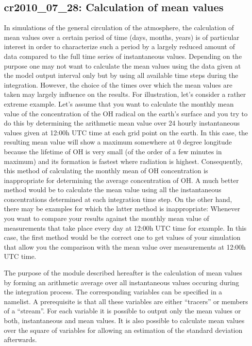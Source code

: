\begin{appendix}
\clearpage\newpage
\section{cr2010\_07\_28: Calculation of mean values}\label{cr20100728}

In simulations of the general circulation of the atmosphere, the
calculation of mean values over a certain period of  
time (days, months, years) is of particular interest in order to characterize
such a period by a largely reduced amount of data compared to the full time 
series of instantaneous values. Depending on the purpose one may not want
to calculate the mean values using the data given at the model output 
interval only but by
using all available
time steps during the integration. However, the choice of the times over which
the mean values are taken may largely influence on the results. For 
illustration, let's consider a rather extreme example. Let's 
assume that you
want to calculate the monthly mean value 
of the concentration of the OH radical
on the earth's surface and you try to do this by determining the arithmetic
mean value over 24 hourly instantaneous values given at 12:00h UTC time at 
each grid point on the earth. In this case, the resulting mean value will show
a maximum somewhere at 0 degree longitude because the lifetime of OH is very
small (of the order of a few minutes in maximum) 
and its formation is fastest where radiation
is highest. Consequently, this method of calculating the monthly mean of 
OH concentration is inappropriate for determining the average concentration
of OH. A much better method would be to calculate
the mean value using all the instantaneous concentrations determined at each
integration time step. On the other hand, there may be examples for
which the latter 
method is inappropriate: Whenever you want to compare your results against the 
monthly mean value of
measurements that take place every day at 12:00h UTC time for example. In this
case, the first method would be the correct one to get values of your 
simulation that allow you the comparison with the mean value over
measurements at 12:00h UTC time.

The purpose of the module described hereafter is the calculation of mean values
by forming an arithmetic average over all instantaneous values occuring during
the integration process. The corresponding variables can be specified in a
namelist. A prerequisite is that all these variables are either ``tracers'' or
members of a ``stream''. For each variable
it is possible to output only the mean values or both,
instantaneous and
mean values. It is also possible to calculate mean values over the 
square of variables for allowing an estimation of the standard deviation 
afterwards.


\end{appendix}
